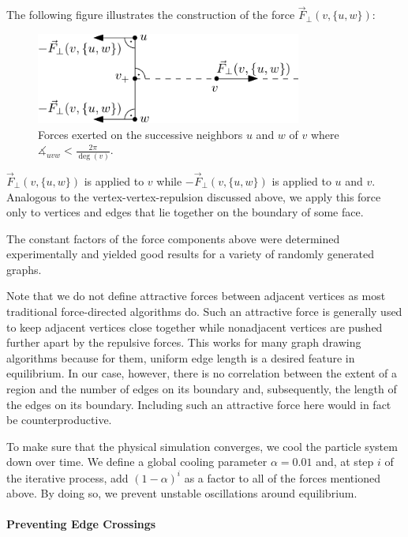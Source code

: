 \begin{itemize}
The following figure illustrates the construction of the force $\vec{F}_\bot(v,\{u,w\})$:
%
\begin{figure}[H]
	\centering
	\includegraphics[height=30mm]{Resources/Drawing-Forces-VertexEdgeRepulsion.pdf}
	\caption{Forces exerted on the successive neighbors $u$ and $w$ of $v$ where $\measuredangle_{uvw} < \frac{2\pi}{\deg(v)}$.}
	\label{fig:drawing-forces-vertex-edge-repulsion}
\end{figure}

$\vec{F}_\bot(v,\{u,w\})$ is applied to $v$ while $-\vec{F}_\bot(v,\{u,w\})$ is applied to $u$ and $v$. Analogous to the vertex-vertex-repulsion discussed above, we apply this force only to vertices and edges that lie together on the boundary of some face.
\end{itemize}

The constant factors of the force components above were determined experimentally and yielded good results for a variety of randomly generated graphs.

Note that we do not define attractive forces between adjacent vertices as most traditional force-directed algorithms do.
Such an attractive force is generally used to keep adjacent vertices close together while nonadjacent vertices are pushed further apart by the repulsive forces.
This works for many graph drawing algorithms because for them, uniform edge length is a desired feature in equilibrium.
In our case, however, there is no correlation between the extent of a region and the number of edges on its boundary and, subsequently, the length of the edges on its boundary.
Including such an attractive force here would in fact be counterproductive.

To make sure that the physical simulation converges, we cool the particle system down over time.
We define a global cooling parameter $\alpha = 0.01$ and, at step $i$ of the iterative process, add $(1 - \alpha)^i$ as a factor to all of the forces mentioned above.
By doing so, we prevent unstable oscillations around equilibrium.



\paragraph{Preventing Edge Crossings}

